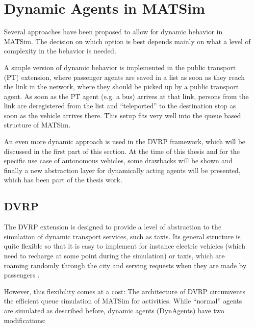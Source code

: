 \section{Dynamic Agents in MATSim}
\label{sec:dynagent}

Several approaches have been proposed to allow for dynamic behavior in MATSim.
The decision on which option is best depends mainly on what a
level of complexity in the behavior is needed.

A simple version of dynamic behavior is implemented in the public transport (PT)
extension, where passenger agents are saved in a list as soon as they reach the
link in the network, where they should be picked up by a public transport agent.
As soon as the PT agent (e.g. a bus) arrives at that link, persons from the link
are deregistered from the list and ``teleported'' to the destination stop as soon
as the vehicle arrives there. This setup fits very well into the queue based structure
of MATSim.

An even more dynamic approach is used in the DVRP framework, which will be discussed
in the first part of this section. At the time of this thesis and for the specific
use case of autonomous vehicles, some drawbacks will be shown and finally a new
abstraction layer for dynamically acting agents will be presented, which has been
part of the thesis work.

\subsection{DVRP}

The DVRP extension \citep{DVRP12, Horni2015} is designed to provide a level of abstraction to the simulation of
dynamic transport services, such as taxis. Its general structure is quite flexible
so that it is easy to implement for instance electric vehicles \citep{Bischoff2014} (which need to recharge
at some point during the simulation) or taxis, which are roaming randomly through
the city and serving requests when they are made by passengers \citep{Maciejewski2015}.

However, this flexibility comes at a cost: The architecture of DVRP
circumvents the efficient queue simulation of MATSim for activities. While ``normal''
agents are simulated as described before, dynamic agents (DynAgents) have two
modifications:


